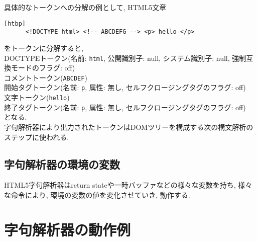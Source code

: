 \documentclass[uplatex,a4j]{jsreport}
\begin{document}
具体的なトークンへの分解の例として, HTML5文章
\begin{lstlisting}[basicstyle=\ttfamily\footnotesize, frame=single][htbp]
      <!DOCTYPE html> <!-- ABCDEFG --> <p> hello </p>
\end{lstlisting}
をトークンに分解すると, \\
DOCTYPEトークン(名前: \texttt{html}, 公開識別子: null, システム識別子: null, 強制互換モードのフラグ: off)\\
コメントトークン(\texttt{ABCDEF})\\
開始タグトークン(名前: \texttt{p}, 属性: 無し, セルフクロージングタグのフラグ: off)\\
文字トークン(\texttt{hello})\\
終了タグトークン(名前: \texttt{p}, 属性: 無し, セルフクロージングタグのフラグ: off)\\
となる. \\

字句解析器により出力されたトークンはDOMツリーを構成する次の構文解析のステップに使われる.

\subsection*{字句解析器の環境の変数}
HTML5字句解析器はreturn stateや一時バッファなどの様々な変数を持ち, 様々な命令により, 環境の変数の値を変化させていき, 動作する.

\section{字句解析器の動作例}
\end{document}
